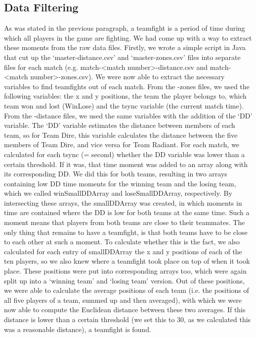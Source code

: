 \documentclass[11pt,twoside,a4paper]{article}
\begin{document}
\subsection{Data Filtering}
As was stated in the previous paragraph, a teamfight is a period of time during which all players in the game are fighting. We had come up with a way to extract these moments from the raw data files. Firstly, we wrote a simple script in Java that cut up the `master-distance.csv' and `master-zones.csv' files into separate files for each match (e.g. match-\textless match number\textgreater-distance.csv and match-\textless match number\textgreater-zones.csv). We were now able to extract the necessary variables to find teamfights out of each match.
\newline\newline
From the -zones files, we used the following variables: the x and y positions, the team the player belongs to, which team won and lost (WinLose) and the tsync variable (the current match time). From the -distance files, we used the same variables with the addition of the `DD' variable. The `DD' variable estimates the distance between members of each team, so for Team Dire, this variable calculates the distance between the five members of Team Dire, and vice versa for Team Radiant.
\newline\newline
For each match, we calculated for each tsync (= second) whether the DD variable was lower than a certain threshold. If it was, that time moment was added to an array along with its corresponding DD. We did this for both teams, resulting in two arrays containing low DD time moments for the winning team and the losing team, which we called winSmallDDArray and loseSmallDDArray, respectively. By intersecting these arrays, the smallDDArray was created, in which moments in time are contained where the DD is low for both teams at the same time. Such a moment means that players from both teams are close to their teammates. The only thing that remains to have a teamfight, is that both teams have to be close to each other at such a moment.
\newline\newline
To calculate whether this is the fact, we also calculated for each entry of smallDDArray the x and y positions of each of the ten players, so we also knew where a teamfight took place on top of when it took place. These positions were put into corresponding arrays too, which were again split up into a `winning team' and `losing team' version. Out of these positions, we were able to calculate the average positions of each team (i.e. the positions of all five players of a team, summed up and then averaged), with which we were now able to compute the Euclidean distance between these two averages. If this distance is lower than a certain threshold (we set this to 30, as we calculated this was a reasonable distance), a teamfight is found.
\end{document}
